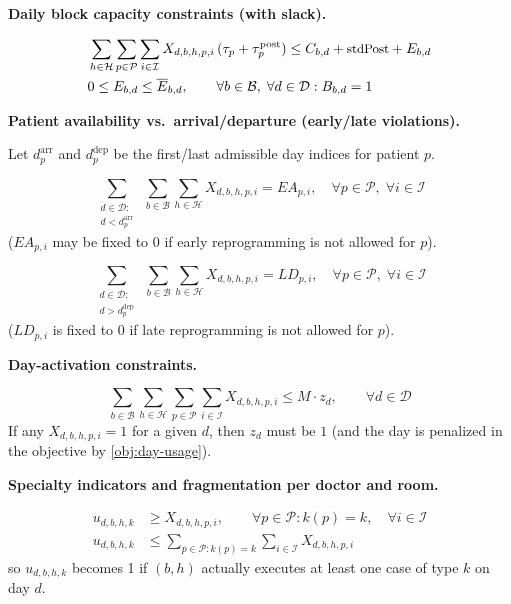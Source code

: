 \textbf{Daily block capacity constraints (with slack).}

\begin{align}
&\sum_{h\in\mathcal{H}} \sum_{p\in\mathcal{P}} \sum_{i\in\mathcal{I}}
   X_{d,b,h,p,i}\, (\tau_p + \tau^{\text{post}}_p)
\le
C_{b,d}+\text{\small  stdPost}+E_{b,d}
\label{c:capacity}\\
&0 \le E_{b,d} \le \overline{E}_{b,d},
\qquad \forall b\in\mathcal{B},\; \forall d\in\mathcal{D}: B_{b,d}=1
\end{align}

\textbf{Patient availability vs.\ arrival/departure (early/late violations).}

Let $d^{\text{arr}}_p$ and $d^{\text{dep}}_p$ be the first/last admissible day indices for patient $p$.

\begin{equation}
\sum_{\substack{d\in\mathcal{D}:\\ d < d^{\text{arr}}_p}}
\;\sum_{b\in\mathcal{B}}\sum_{h\in\mathcal{H}}
X_{d,b,h,p,i}
= EA_{p,i},
\quad \forall p\in\mathcal{P},\; \forall i\in\mathcal{I}
\label{c:early}
\end{equation}
($EA_{p,i}$ may be fixed to $0$ if early reprogramming is not allowed for $p$).

\begin{equation}
\sum_{\substack{d\in\mathcal{D}:\\ d > d^{\text{dep}}_p}}
\;\sum_{b\in\mathcal{B}}\sum_{h\in\mathcal{H}}
X_{d,b,h,p,i}
= LD_{p,i},
\quad \forall p\in\mathcal{P},\; \forall i\in\mathcal{I}
\label{c:late}
\end{equation}
($LD_{p,i}$ is fixed to $0$ if late reprogramming is not allowed for $p$).

\textbf{Day-activation constraints.}

\begin{equation}
\sum_{b\in\mathcal{B}}\sum_{h\in\mathcal{H}}\sum_{p\in\mathcal{P}}\sum_{i\in\mathcal{I}}
X_{d,b,h,p,i}
\le
M \cdot z_d,
\qquad \forall d\in\mathcal{D}
\label{c:day-activation}
\end{equation}
If any $X_{d,b,h,p,i}=1$ for a given $d$, then $z_d$ must be $1$ (and the day is penalized in the objective by \eqref{obj:day-usage}).

\textbf{Specialty indicators and fragmentation per doctor and room.}

\begin{align}
u_{d,b,h,k} &\ge X_{d,b,h,p,i}, \qquad \forall p\in\mathcal{P}: k(p)=k,\quad \forall i\in\mathcal{I}
\label{c:u-lower}\\
u_{d,b,h,k} &\le \sum_{p\in\mathcal{P}:k(p)=k}\sum_{i\in\mathcal{I}} X_{d,b,h,p,i}
\label{c:u-upper}
\end{align}
so $u_{d,b,h,k}$ becomes 1 if $(b,h)$ actually executes at least one case of type $k$ on day $d$.

